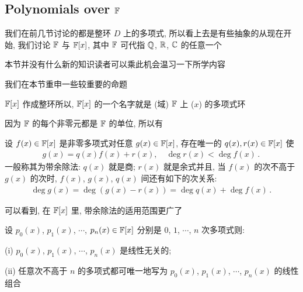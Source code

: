 \subsection*{Polynomials over $\mathbb{F}$}

我们在前几节讨论的都是整环 $D$ 上的多项式, 所以看上去是有些抽象的\period 从现在开始, 我们讨论 $\mathbb{F}$ 与 $\mathbb{F}[x]$, 其中 $\mathbb{F}$ 可代指 $\mathbb{Q}$, $\mathbb{R}$, $\mathbb{C}$ 的任意一个\period

本节并没有什么新的知识\period 读者可以乘此机会温习一下所学内容\period

我们在本节重申一些较重要的命题\period

\begin{proposition}
    $\mathbb{F}[x]$ 作成整环\period 所以, $\mathbb{F}[x]$ 的一个名字就是 (域) $\mathbb{F}$ 上 ($x$) 的多项式环\period
\end{proposition}

因为 $\mathbb{F}$ 的每个非零元都是 $\mathbb{F}$ 的单位, 所以有

\begin{proposition}
    设 $f(x) \in \mathbb{F}[x]$ 是非零多项式\period 对任意 $g(x) \in \mathbb{F}[x]$, 存在唯一的 $q(x), r(x) \in \mathbb{F}[x]$ 使
    \begin{align*}
        g(x) = q(x) f(x) + r(x), \quad \deg r(x) < \deg f(x) \period
    \end{align*}
    一般称其为带余除法: $q(x)$ 就是商; $r(x)$ 就是余式\period 并且, 当 $f(x)$ 的次不高于 $g(x)$ 的次时, $f(x)$, $g(x)$, $q(x)$ 间还有如下的次关系:
    \begin{align*}
        \deg g(x) = \deg (g(x) - r(x)) = \deg q(x) + \deg f(x) \period
    \end{align*}
\end{proposition}

可以看到, 在 $\mathbb{F}[x]$ 里, 带余除法的适用范围更广了\period

\begin{proposition}
    设 $p_0 (x)$, $p_1 (x)$, $\cdots$, $p_n (x) \in \mathbb{F}[x]$ 分别是 $0$, $1$, $\cdots$, $n$ 次多项式\period 则:

    (i) $p_0 (x)$, $p_1 (x)$, $\cdots$, $p_n (x)$ 是线性无关的;

    (ii) 任意次不高于 $n$ 的多项式都可唯一地写为 $p_0 (x)$, $p_1 (x)$, $\cdots$, $p_n (x)$ 的线性组合\period
\end{proposition}

